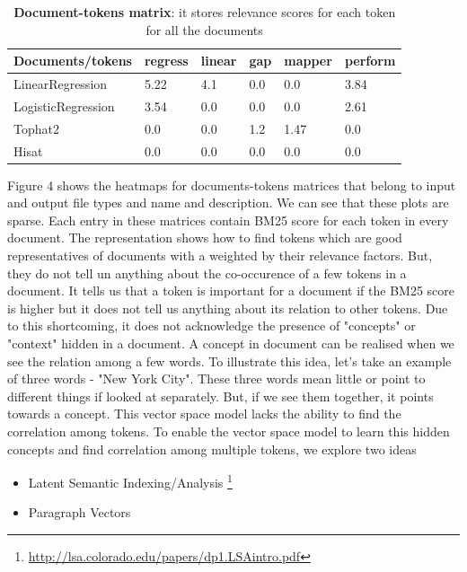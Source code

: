 \begin{table}[ht]
\begin{center}
    \begin{tabular}{|l|l|l|l|l|l|}
        \hline
        Documents/tokens   & regress & linear & gap & mapper & perform \\ \hline
        LinearRegression   & 5.22 & 4.1 & 0.0 & 0.0  & 3.84 \\ \hline
        LogisticRegression & 3.54 & 0.0 & 0.0 & 0.0  & 2.61 \\ \hline
        Tophat2            & 0.0  & 0.0 & 1.2 & 1.47 & 0.0 \\ \hline
        Hisat              & 0.0  & 0.0 & 0.0 & 0.0  & 0.0 \\ \hline
    \end{tabular}
    \end{center}
    \caption[Documents-tokens matrix]{\textbf{Document-tokens matrix}: it stores relevance scores for each token for all the documents\\}
    \label{tab:accuracy}
\end{table}

Figure 4 shows the heatmaps for documents-tokens matrices that belong to input and output file types and name and description. We can see that these plots are sparse. Each entry in these matrices contain BM25 score for each token in every document. The representation shows how to find tokens which are good representatives of documents with a weighted by their relevance factors. But, they do not tell un anything about the co-occurence of a few tokens in a document. It tells us that a token is important for a document if the BM25 score is higher but it does not tell us anything about its relation to other tokens. Due to this shortcoming, it does not acknowledge the presence of "concepts" or "context" hidden in a document. A concept in document can be realised when we see the relation among a few words. To illustrate this idea, let's take an example of three words - "New York City". These three words mean little or point to different things if looked at separately. But, if we see them together, it points towards a concept. This vector space model lacks the ability to find the correlation among tokens. To enable the vector space model to learn this hidden concepts and find correlation among multiple tokens, we explore two ideas
\begin{itemize}
\item Latent Semantic Indexing/Analysis \footnote{\url{http://lsa.colorado.edu/papers/dp1.LSAintro.pdf}}
\item Paragraph Vectors
\end{itemize}

